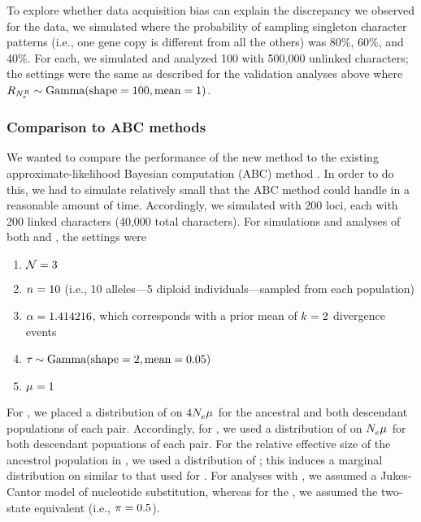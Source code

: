 To explore whether data acquisition bias can explain the discrepancy we
observed for the  data, we simulated \datasets where the probability
of sampling singleton character patterns (i.e., one gene copy is different from
all the others) was 80\%, 60\%, and 40\%.
For each, we simulated and analyzed 100 \datasets with 500,000 unlinked
characters; the settings were the same as described for the validation analyses
above where
$R_{N_{e}^{R{}}} \sim \textrm{Gamma}(\textrm{shape} = 100, \textrm{mean} = 1)$.


\subsubsection{Comparison to ABC methods}
We wanted to compare the performance of the new method to the existing
approximate-likelihood Bayesian computation (ABC) method \dppmsbayes 
\citep{Oaks2014dpp}.
In order to do this, we had to simulate relatively small \datasets that the ABC
method could handle in a reasonable amount of time.
Accordingly, we simulated \datasets with 200 loci, each with 200 linked
characters (40,000 total characters).
For simulations and analyses of both \ecoevolity and \dppmsbayes, the settings
were
\begin{enumerate}
    \item $\mathcal{N} = 3$
    \item $n_{}^{} = 10$ (i.e., 10 alleles---5 diploid
        individuals---sampled from each population)
    \item $\alpha = 1.414216$, which corresponds with a prior mean of
        $k_{} = 2$ divergence events
    \item $\tau_{} \sim \textrm{Gamma}(\textrm{shape} = 2, \textrm{mean} = 0.05)$
    \item $\mu_{} = 1$
\end{enumerate}
For \dppmsbayes,
we placed a distribution of  on $4N_{e}^{}{}\mu_{}{}$
for the ancestral and both descendant populations of each pair.
Accordingly, for \ecoevolity, we used a distribution of  on
$N_{e}^{}{}\mu_{}{}$ for both descendant popuations of each pair.
For the relative effective size of the ancestrol population in \ecoevolity,
we used a distribution of
;
this induces a marginal distribution on \epopsize[\rootpopindex] similar to
that used for \dppmsbayes.
For analyses with \dppmsbayes, we assumed a Jukes-Cantor model of nucleotide
substitution, whereas for the \ecoevolity, we assumed the two-state equivalent
(i.e., $\pi_{} = 0.5$).

